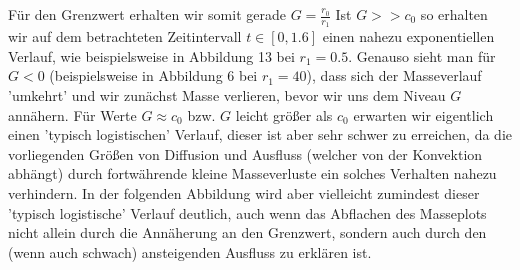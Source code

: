 Für den Grenzwert erhalten wir somit gerade $G = \frac{r_0}{r_1}$
Ist $G >> c_0 $ so erhalten wir auf dem betrachteten Zeitintervall $t \in [0,1.6]$ einen nahezu exponentiellen Verlauf, wie beispielsweise in  Abbildung 13 bei $r_1 = 0.5$. Genauso sieht man für $G<0$ (beispielsweise in Abbildung 6 bei $r_1 = 40$), dass sich der Masseverlauf 'umkehrt' und wir zunächst Masse verlieren, bevor wir uns dem Niveau $G$ annähern.
Für Werte $G \approx c_0 $ bzw. $G$ leicht größer als $c_0$ erwarten wir eigentlich einen 'typisch logistischen' Verlauf, dieser ist aber sehr schwer zu erreichen, da die vorliegenden Größen von Diffusion und Ausfluss (welcher von der Konvektion abhängt) durch fortwährende kleine Masseverluste ein solches Verhalten nahezu verhindern.
\newline
In der folgenden Abbildung wird aber vielleicht zumindest dieser 'typisch logistische' Verlauf deutlich, auch wenn das Abflachen des Masseplots nicht allein durch die Annäherung an den Grenzwert, sondern auch durch den (wenn auch schwach) ansteigenden Ausfluss zu erklären ist. 
\begin{figure}[H]
	\centering
\end{figure}

